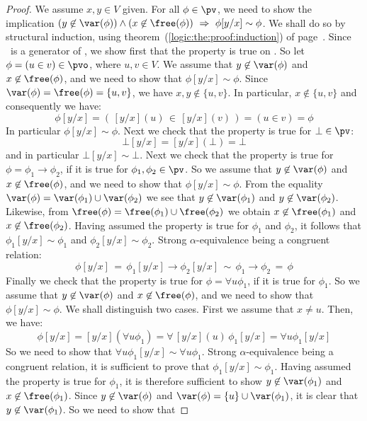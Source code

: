 \noindent
\begin{proof}
We assume $x,y\in V$ given. For all $\phi\in\pv$, we need to show
the implication $(y\not\in\var(\phi))\land(x\not\in\free(\phi))\
\Rightarrow\ \phi[y/x]\sim\phi$. We shall do so by structural
induction, using theorem~(\ref{logic:the:proof:induction}) of
page~\pageref{logic:the:proof:induction}. Since \pvo\ is a generator
of \pv, we show first that the property is true on \pvo. So let
$\phi = (u\in v)\in\pvo$, where $u,v\in V$. We assume that
$y\not\in\var(\phi)$ and $x\not\in\free(\phi)$, and we need to show
that $\phi[y/x]\sim\phi$. Since $\var(\phi)=\free(\phi)=\{u,v\}$, we
have $x,y\not\in\{u,v\}$. In particular, $x\not\in\{u,v\}$ and
consequently we have:
    \[
    \phi[y/x]=(\,[y/x](u)\,\in\,[y/x](v)\,)=(u\in v)=\phi
    \]
In particular $\phi[y/x]\sim\phi$. Next we check that the property
is true for $\bot\in\pv$:
    \[
    \bot[y/x]=[y/x](\bot)=\bot
    \]
and in particular $\bot[y/x]\sim\bot$. Next we check that the
property is true for $\phi=\phi_{1}\to\phi_{2}$, if it is true for
$\phi_{1},\phi_{2}\in\pv$. So we assume that $y\not\in\var(\phi)$
and $x\not\in\free(\phi)$, and we need to show that
$\phi[y/x]\sim\phi$. From the equality
$\var(\phi)=\var(\phi_{1})\cup\var(\phi_{2})$ we see that
$y\not\in\var(\phi_{1})$ and $y\not\in\var(\phi_{2})$. Likewise,
from $\free(\phi)=\free(\phi_{1})\cup\free(\phi_{2})$ we obtain
$x\not\in\free(\phi_{1})$ and $x\not\in\free(\phi_{2})$. Having
assumed the property is true for $\phi_{1}$ and $\phi_{2}$, it
follows that $\phi_{1}[y/x]\sim\phi_{1}$ and
$\phi_{2}[y/x]\sim\phi_{2}$. Strong $\alpha$-equivalence
being a congruent relation:
    \[
    \phi[y/x]\,=\,\phi_{1}[y/x]\to\phi_{2}[y/x]\,\sim\,\phi_{1}\to\phi_{2}\,=\,\phi
    \]
Finally we check that the property is true for $\phi=\forall
u\phi_{1}$, if it is true for $\phi_{1}$. So we assume that
$y\not\in\var(\phi)$ and $x\not\in\free(\phi)$, and we need to show
that $\phi[y/x]\sim\phi$. We shall distinguish two cases. First we
assume that $x\neq u$. Then, we have:
    \[
    \phi[y/x]=[y/x](\forall u\phi_{1})=\forall\,[y/x](u)\,\phi_{1}[y/x]=\forall u\phi_{1}[y/x]
    \]
So we need to show that $\forall u\phi_{1}[y/x]\sim\forall
u\phi_{1}$. Strong $\alpha$-equivalence being a congruent
relation, it is sufficient to prove that
$\phi_{1}[y/x]\sim\phi_{1}$. Having assumed the property is true for
$\phi_{1}$, it is therefore sufficient to show
$y\not\in\var(\phi_{1})$ and $x\not\in\free(\phi_{1})$. Since
$y\not\in\var(\phi)$ and $\var(\phi)=\{u\}\cup\var(\phi_{1})$, it is
clear that $y\not\in\var(\phi_{1})$. So we need to show that

\end{proof}
